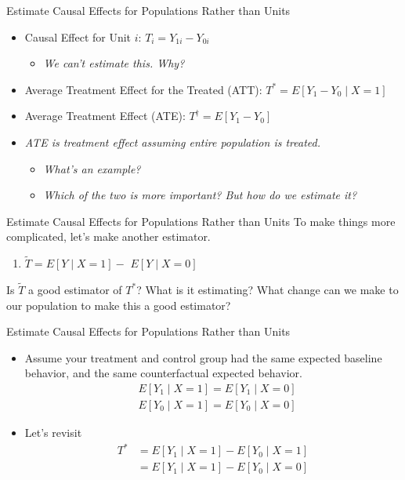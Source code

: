 \documentclass{beamer}
\begin{document}
\begin{frame}{Estimate Causal Effects for Populations Rather than Units}
  \begin{itemize}
    \item<+-> Causal Effect for Unit $i$: $T_i=Y_{1 i}-Y_{0 i}$
    \begin{itemize}
      \item \textit{We can't estimate this. Why?}
    \end{itemize}
    \item<+-> Average Treatment Effect for the Treated (ATT): $T^*=E\left[Y_1-Y_0 \mid X=1\right]$
    \item<+-> Average Treatment Effect (ATE): $T^{\dagger}=E\left[Y_1-Y_0\right]$
    \item<+-> \textit{ATE is treatment effect assuming entire population is treated.}
      \begin{itemize}
        \item \textit{What's an example?}
        \item \textit{Which of the two is more important? But how do we estimate it?}
      \end{itemize}
  \end{itemize}
\end{frame}


\begin{frame}{Estimate Causal Effects for Populations Rather than Units}
  To make things more complicated, let's make another estimator.
  \begin{enumerate}
    \item<+-> $\tilde{T}=E[Y \mid X=1]-$ $E[Y \mid X=0]$
  \end{enumerate}
  Is $\tilde{T}$ a good estimator of $T^*$? What is it estimating?
  What change can we make to our population to make this a good estimator?
\end{frame}

\begin{frame}{Estimate Causal Effects for Populations Rather than Units}
  \begin{itemize}
    \item<+-> Assume your treatment and control group had the same expected baseline behavior, and the same counterfactual expected behavior.
    $$
    \begin{aligned}
    & E\left[Y_1 \mid X=1\right]=E\left[Y_1 \mid X=0\right] \\
    & E\left[Y_0 \mid X=1\right]=E\left[Y_0 \mid X=0\right]
    \end{aligned}
    $$
    \item<+-> Let's revisit $$ \begin{aligned}
      T^* & = E\left[Y_1 \mid X=1\right]-E\left[Y_0 \mid X=1\right] \\
          & = E\left[Y_1 \mid X=1\right]-E\left[Y_0 \mid X=0\right] 
    \end{aligned} $$
  \end{itemize}
\end{frame}
\end{document}
